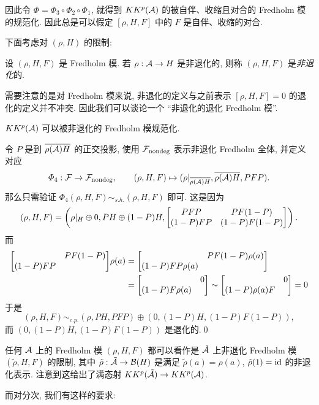 因此令 $ \varPhi=\varPhi_3\circ\varPhi_2\circ\varPhi_1 $, 就得到 $ KK^p(\mathcal{A}) $ 的被自伴、收缩且对合的 Fredholm 模的规范化. 因此总是可以假定 $ [\rho, H, F] $ 中的 $ F $ 是自伴、收缩的对合.

下面考虑对 $ (\rho, H) $ 的限制:

\begin{Definition}[非退化]
	设 $ (\rho, H, F) $ 是 Fredholm 模. 若 $ \rho : \mathcal{A}\to H $ 是非退化的, 则称 $ (\rho, H, F) $ 是\emph{非退化}的.
\end{Definition}

需要注意的是对 Fredholm 模来说, 非退化的定义与之前表示 $ [\rho, H, F]=0 $ 的退化的定义并不冲突. 因此我们可以谈论一个 ``非退化的退化 Fredholm 模''.

\begin{Lemma}\label{lem:4.1-非退化条件}
	$ KK^p(\mathcal{A}) $ 可以被非退化的 Fredholm 模规范化.
\end{Lemma}
\begin{Proof}
	令 $ P $ 是到 $ \overline{\rho(\mathcal{A})H} $ 的正交投影, 使用 $ \mathcal{F}_{\text{nondeg}} $ 表示非退化 Fredholm 全体, 并定义对应
	\[
		\varPhi_4 : \mathcal{F}\to\mathcal{F}_{\text{nondeg}},\qquad (\rho, H, F)\mapsto(\rho|_{\overline{\rho(\mathcal{A})H}},\overline{\rho(\mathcal{A})H}, PFP).
	\]
	那么只需验证 $ \varPhi_4(\rho, H, F)\sim_{s.h.}(\rho, H, F) $ 即可. 这是因为
	\[
		(\rho, H, F)=\left(\rho|_H\oplus 0, PH\oplus(1-P)H,\mqty[PFP & PF(1-P) \\ (1-P)FP & (1-P)F(1-P)]\right).
	\]
	而
	\[
		\begin{aligned}
			\mqty[ & PF(1-P) \\ (1-P)FP & ]\rho(a)&=\mqty[ & PF(1-P)\rho(a) \\ (1-P)FP\rho(a) & ]\\
			&=\mqty[ & 0 \\ (1-P)F\rho(a) & ]\sim\mqty[ & 0 \\ (1-P)\rho(a)F & ]=0
		\end{aligned}
	\]
	于是
	\[
		(\rho, H, F)\sim_{c.p.}(\rho, PH, PFP)\oplus(0, (1-P)H, (1-P)F(1-P)),
	\]
	而 $ (0, (1-P)H, (1-P)F(1-P)) $ 是退化的.\qed
\end{Proof}

任何 $ \mathcal{A} $ 上的 Fredholm 模 $ (\rho, H, F) $ 都可以看作是 $ \tilde{\mathcal{A}} $ 上非退化 Fredholm 模 $ (\tilde{\rho}, H, F) $ 的限制, 其中 $ \tilde{\rho} : \tilde{\mathcal{A}}\to\mathcal{B}(H) $ 是满足 $ \tilde{\rho}(a)=\rho(a) $, $ \tilde{\rho}(1)=\mathrm{id} $ 的非退化表示. 注意到这给出了满态射 $ KK^p(\tilde{\mathcal{A}})\to KK^p(\mathcal{A}) $.

而对分次, 我们有这样的要求:

